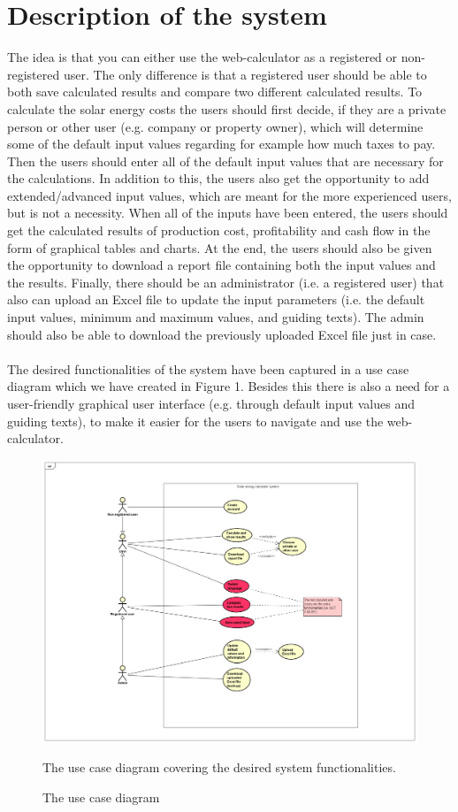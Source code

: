 \documentclass[]{article}
\begin{document}
\section{Description of the system}
The idea is that you can either use the web-calculator as a registered or non-
registered user. The only difference is that a registered user should be able
to both save calculated results and compare two different calculated results. To calculate the solar energy costs the users should first decide, if they are a private person or other user (e.g. company or property owner), which will determine some of the default input values regarding for example how much taxes to pay. Then the users should 
enter all of the default input values that are necessary for the calculations. In
addition to this, the users also get the opportunity to add extended/advanced
input values, which are meant for the more experienced users, but is not a necessity. When all of the inputs have been
entered, the users should get the calculated results of production cost,
profitability and cash flow in the form of graphical tables and charts.
At the end, the users should also be given the opportunity to download a report file
containing both the input values and the results. Finally, there should be an
administrator (i.e. a registered user) that also can upload an Excel file to update
the input parameters (i.e. the default input values, minimum and maximum
values, and guiding texts). The admin should also be able to download the previously uploaded Excel file just in case. 
\\\\
The desired functionalities of the system have been captured in a use case
diagram which we have created in Figure 1. Besides this there is also a need
for a user-friendly graphical user interface (e.g. through default input values
and guiding texts), to make it easier for the users to navigate and use the web-
calculator.

\begin{figure}[H]
\includegraphics[width=1.0\linewidth]{usecase}
\caption{The use case diagram}
\medskip
\small
The use case diagram covering the desired system functionalities. 
\label{fig:usecase}
\end{figure}
\end{document}
